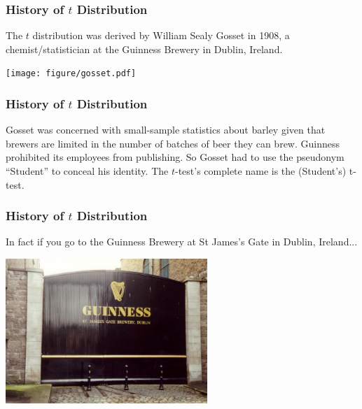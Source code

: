 \documentclass[handout]{beamer}
\newcommand{\blue}[1]{\textcolor{blue2}{#1}}
\begin{document}
\begin{frame}
\frametitle{History of $t$ Distribution}
The $t$ distribution was derived by William Sealy Gosset in 1908, a chemist/statistician at the Guinness Brewery in Dublin, Ireland.
\begin{center}
\texttt{[image: figure/gosset.pdf]}
\end{center}
\end{frame}


\begin{frame}
\frametitle{History of $t$ Distribution}
Gosset was concerned with \blue{small-sample statistics} about barley given that brewers are limited in the number of batches of beer they can brew.
\pause \vskip 0.5cm
Guinness prohibited its employees from publishing.  So Gosset had to use the pseudonym ``Student'' to conceal his identity.
\pause \vskip 0.5cm
The $t$-test's complete name is the \blue{(Student's) t-test}.  
\end{frame}


\begin{frame}
\frametitle{History of $t$ Distribution}
In fact if you go to the Guinness Brewery at St James's Gate in Dublin, Ireland...
\begin{center}
\includegraphics[width=3in]{figure/brewery.jpg}
\end{center}
\
\end{frame}
\end{document}
